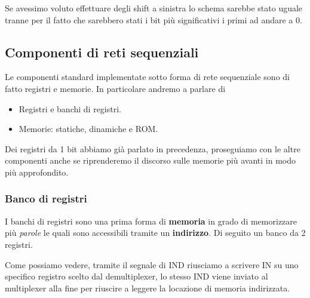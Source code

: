 Se avessimo voluto effettuare degli shift a sinistra lo schema sarebbe stato uguale tranne per il
fatto che sarebbero stati i bit più significativi i primi ad andare a 0.

\subsection{Componenti di reti sequenziali}
Le componenti standard implementate sotto forma di rete sequenziale sono di fatto registri e
memorie. In particolare andremo a parlare di
\begin{itemize}
	\item Registri e banchi di registri.
	\item Memorie: statiche, dinamiche e ROM.
\end{itemize}
Dei registri da 1 bit abbiamo già parlato in precedenza, proseguiamo con le altre componenti anche
se riprenderemo il discorso sulle memorie più avanti in modo più approfondito.

\subsubsection{Banco di registri}
I banchi di registri sono una prima forma di \textbf{memoria} in grado di memorizzare più
\emph{parole} le quali sono accessibili tramite un \textbf{indirizzo}. Di seguito un banco da 2
registri.
\begin{center}
\end{center}
Come possiamo vedere, tramite il segnale di IND riusciamo a scrivere IN su uno specifico registro
scelto dal demultiplexer, lo stesso IND viene inviato al multiplexer alla fine per riuscire a
leggere la locazione di memoria indirizzata.

